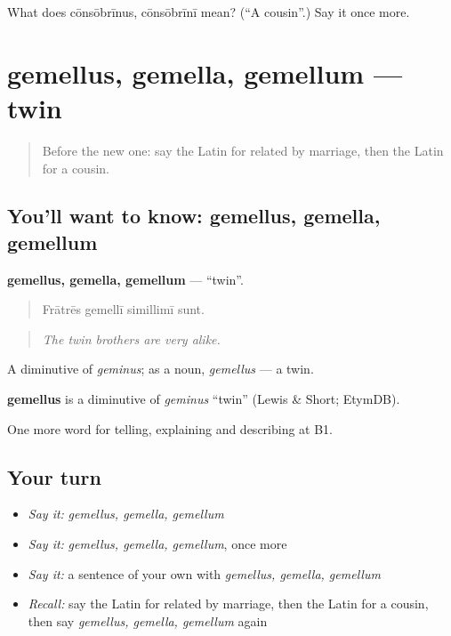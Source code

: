 \begin{tcolorbox}[breakable,colback=teal!4,colframe=teal!35!black,title={Before you move on}]
What does cōnsōbrīnus, cōnsōbrīnī mean? (\textquotedblleft{}A cousin\textquotedblright{}.) Say it once more.
\end{tcolorbox}
\section[gemellus, gemella, gemellum]{gemellus, gemella, gemellum — twin}

\label{lesson:LA-C528-gemellus}



\begin{quote}
Before the new one: say the Latin for related by marriage, then the Latin for a cousin.
\end{quote}

\subsection*{You'll want to know: gemellus, gemella, gemellum}
\textbf{gemellus, gemella, gemellum} — \textquotedblleft{}twin\textquotedblright{}.

\begin{quote}
Frātrēs gemellī simillimī sunt.
\end{quote}

\begin{quote}
\emph{The twin brothers are very alike.}
\end{quote}

A diminutive of \emph{geminus}; as a noun, \emph{gemellus} — a twin.

\begin{cousinweb}
\textbf{gemellus} is a diminutive of \emph{geminus} \textquotedblleft{}twin\textquotedblright{} (Lewis \& Short; EtymDB).
\end{cousinweb}

\begin{grammarlens}[title={What you've built}]
One more word for telling, explaining and describing at B1.
\end{grammarlens}

\subsection*{Your turn}
\begin{itemize}
\raggedright
  \item \emph{Say it:} \emph{gemellus, gemella, gemellum}
  \item \emph{Say it:} \emph{gemellus, gemella, gemellum}, once more
  \item \emph{Say it:} a sentence of your own with \emph{gemellus, gemella, gemellum}
  \item \emph{Recall:} say the Latin for related by marriage, then the Latin for a cousin, then say \emph{gemellus, gemella, gemellum} again
\end{itemize}

